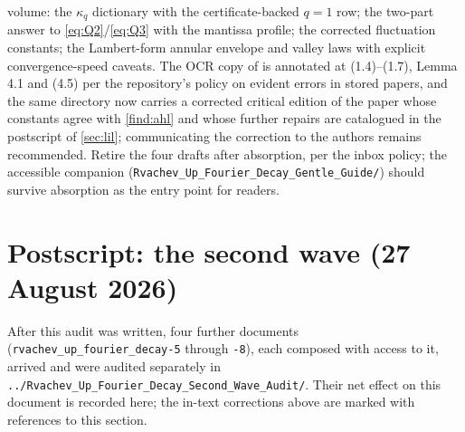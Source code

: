 \documentclass[11pt,oneside]{article}
\theoremstyle{definition}
\theoremstyle{remark}
\begin{document}
\begin{enumerate}
volume: the $\kappa_q$ dictionary with the certificate-backed $q=1$ row;
the two-part answer to \eqref{eq:Q2}/\eqref{eq:Q3} with the mantissa
profile; the corrected fluctuation constants; the Lambert-form annular
envelope and valley laws with explicit convergence-speed caveats.
The OCR copy of \cite{ahl2017} is annotated at (1.4)--(1.7), Lemma 4.1
and (4.5) per the repository's policy on evident errors in stored
papers, and the same directory now carries a corrected critical edition
of the paper whose constants agree with \cref{find:ahl} and whose
further repairs are catalogued in the postscript of \cref{sec:lil};
communicating the correction to the authors remains recommended.
Retire the four drafts after absorption, per the inbox policy; the
accessible companion (\nolinkurl{Rvachev_Up_Fourier_Decay_Gentle_Guide/})
should survive absorption as the entry point for readers.
\end{enumerate}

\section{Postscript: the second wave (27 August 2026)}
\label{sec:second-wave}

After this audit was written, four further documents
(\nolinkurl{rvachev_up_fourier_decay-5} through \nolinkurl{-8}), each
composed with access to it, arrived and were audited separately in
\nolinkurl{../Rvachev_Up_Fourier_Decay_Second_Wave_Audit/}.  Their net
effect on this document is recorded here; the in-text corrections above
are marked with references to this section.
\end{document}
